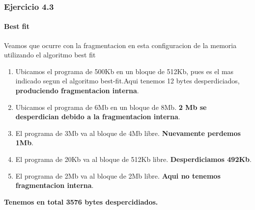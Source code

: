 \documentclass{beamer}
\begin{document}
\begin{frame}
  \frametitle{Ejercicio 4.3}    
  \framesubtitle{Best fit}
    Veamos que ocurre con la fragmentacion en esta configuracion de la memoria utilizando el algoritmo best fit
    \begin{enumerate}
    \setlength{\itemsep}{5pt}
    \pause
    \item Ubicamos el programa de 500Kb en un bloque de 512Kb, pues es el mas indicado segun el algoritmo best-fit.Aqui tenemos 12 bytes desperdiciados, \textbf{produciendo fragmentacion interna}.
    
    \pause
    \item Ubicamos el programa de 6Mb en un bloque de 8Mb. \textbf{2 Mb se desperdician debido a la fragmentacion interna}.

    \pause
    \item El programa de 3Mb va al bloque de 4Mb libre. \textbf{Nuevamente perdemos 1Mb}.

    \pause
    \item El programa de 20Kb va al bloque de 512Kb libre. \textbf{Desperdiciamos 492Kb}.

    \pause
    \item El programa de 2Mb va al bloque de 2Mb libre. \textbf{Aqui no tenemos fragmentacion interna}.
  \end{enumerate}
  \pause
  \textbf{Tenemos en total 3576 bytes despercidiados.}
\end{frame}
\end{document}
